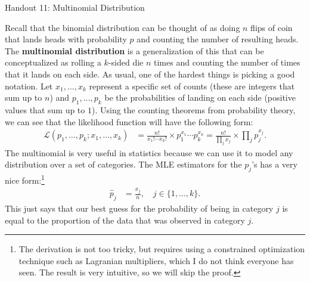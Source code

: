 \documentclass{tufte-handout}
\begin{document}
\justify

{\LARGE Handout 11: Multinomial Distribution}

\vspace*{18pt}

\noindent
Recall that the binomial distribution can be thought of as doing $n$
flips of coin that lands heads with probability $p$ and counting the
number of resulting heads. The \textbf{multinomial distribution} is
a generalization of this that can be conceptualized as rolling a
$k$-sided die $n$ times and counting the number of times that it lands
on each side. As usual, one of the hardest things is picking a good
notation. Let $x_1, \ldots, x_k$ represent a specific set of counts
(these are integers that sum up to $n$) and $p_1, \ldots, p_k$ be the
probabilities of landing on each side (positive values that sum up to
$1$). Using the counting theorems from probability theory, we can
see that the likelihood function will have the following form:
\begin{align*}
\mathcal{L}(p_1, \ldots, p_k; x_1, \ldots, x_k)
&= \frac{n!}{x_1! \cdots x_k!} \times p_1^{x_1} \cdots p_k^{x_k}
= \frac{n!}{\prod_j x_j} \times \prod_j p_j^{x_j}.
\end{align*}
The multinomial is very useful in statistics because we can use it to
model any distribution over a set of categories. The MLE estimators
for the $p_j$'s has a very nice form:\footnote{
  The derivation is not too tricky, but requires using a constrained
  optimization technique such as Lagranian multipliers, which I do 
  not think everyone has seen. The result is very intuitive, so we
  will skip the proof.
}
\begin{align*}
\hat{p}_j &= \frac{x_j}{n}, \quad j \in \{1, \ldots, k \}.
\end{align*}
This just says that our best guess for the probability of being in
category $j$ is equal to the proportion of the data that was observed
in category $j$. 
\end{document}

